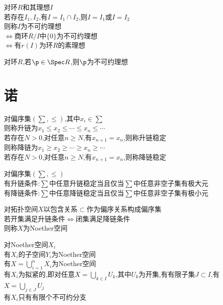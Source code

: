 \begin{dingyi}
对环$R$和其理想$I$\\
若存在$I_1,I_2$,有$I=I_1\cap I_2$,则$I=I_1$或$I=I_2$\\
则称$I$为不可约理想\\
$\Leftrightarrow$商环$R/I$中$\{0\}$为不可约理想\\
$\Leftrightarrow$有$r(I)$为环$R$的素理想
\end{dingyi}

\begin{tuilun}
对环$R$,若$\p\in\Spec R$,则$\p$为不可约理想
\end{tuilun}

\chapter{诺}

\begin{dingyi}
对偏序集$(\sum,\leq)$,其中$x_i\in\sum$\\
则称升链为$x_1\leq x_2\leq \cdots \leq x_n\leq \cdots$\\
若存在$N>0$,对任意$n\geq N$,有$x_{n+1}=x_n$,则称升链稳定\\
则称降链为$x_1\geq x_2\geq \cdots \geq x_n\geq \cdots$\\
若存在$N>0$,对任意$n\geq N$,有$x_{n+1}=x_n$,则称降链稳定
\end{dingyi}

\begin{dingli}
对偏序集$(\sum,\leq)$\\
有升链条件:$\sum$中任意升链稳定当且仅当$\sum$中任意非空子集有极大元\\
有降链条件:$\sum$中任意降链稳定当且仅当$\sum$中任意非空子集有极小元
\end{dingli}

\begin{dingyi}
对拓扑空间$X$以包含关系$\subset$作为偏序关系构成偏序集\\
若开集满足升链条件$\Leftrightarrow$闭集满足降链条件\\
则称$X$为Noether空间
\end{dingyi}

\begin{dingli}
对Noether空间$X_i$\\
有$X_i$的子空间$Y_i$为Noether空间\\
有$X=\bigcup\limits_{i=1}^{n}X_i$为Noether空间\\
有$X_i$为拟紧的,即对任意$X=\bigcup\limits_{k\in I}U_k$,其中$U_k$为开集,有有限子集$J\subset I$,有$X=\bigcup\limits_{j\in J}U_j$\\
有$X_i$只有有限个不可约分支
\end{dingli}

